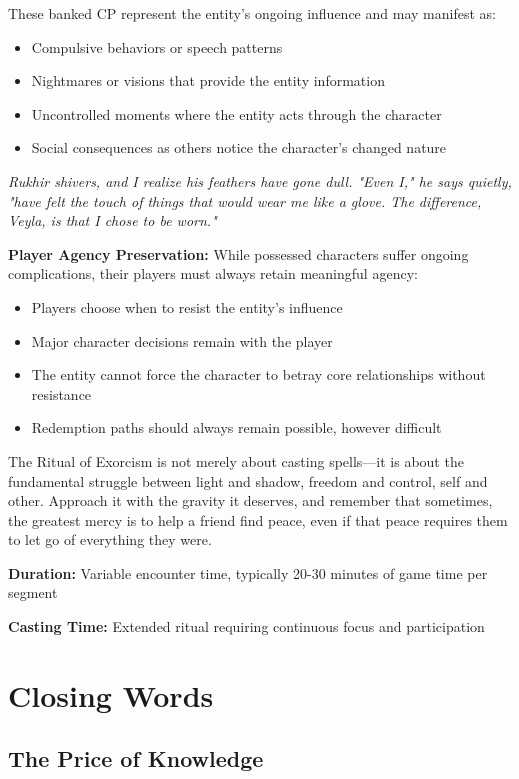 \documentclass[12pt,twoside]{book}
\newcommand{\shadow}[1]{\textit{#1}}
\begin{document}
These banked CP represent the entity's ongoing influence and may manifest as:
\begin{itemize}
\item Compulsive behaviors or speech patterns
\item Nightmares or visions that provide the entity information
\item Uncontrolled moments where the entity acts through the character
\item Social consequences as others notice the character's changed nature
\end{itemize}

\shadow{Rukhir shivers, and I realize his feathers have gone dull. "Even I," he says quietly, "have felt the touch of things that would wear me like a glove. The difference, Veyla, is that I chose to be worn."}

\textbf{Player Agency Preservation:}
While possessed characters suffer ongoing complications, their players must always retain meaningful agency:
\begin{itemize}
\item Players choose when to resist the entity's influence
\item Major character decisions remain with the player
\item The entity cannot force the character to betray core relationships without resistance
\item Redemption paths should always remain possible, however difficult
\end{itemize}

The Ritual of Exorcism is not merely about casting spells—it is about the fundamental struggle between light and shadow, freedom and control, self and other. Approach it with the gravity it deserves, and remember that sometimes, the greatest mercy is to help a friend find peace, even if that peace requires them to let go of everything they were.

\textbf{Duration:} Variable encounter time, typically 20-30 minutes of game time per segment

\textbf{Casting Time:} Extended ritual requiring continuous focus and participation

\chapter{Closing Words}

\section*{The Price of Knowledge}
\end{document}
